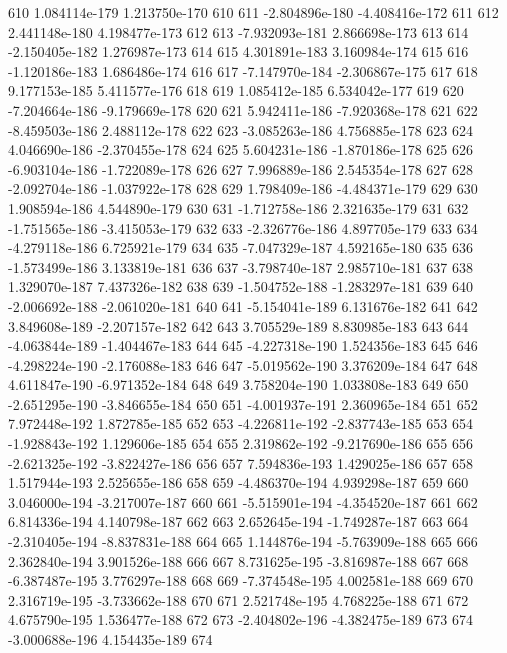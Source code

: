 \documentclass{article}
\begin{document}
\begin{Schunk}
\begin{Soutput}
610   1.084114e-179  1.213750e-170  610
611  -2.804896e-180 -4.408416e-172  611
612   2.441148e-180  4.198477e-173  612
613  -7.932093e-181  2.866698e-173  613
614  -2.150405e-182  1.276987e-173  614
615   4.301891e-183  3.160984e-174  615
616  -1.120186e-183  1.686486e-174  616
617  -7.147970e-184 -2.306867e-175  617
618   9.177153e-185  5.411577e-176  618
619   1.085412e-185  6.534042e-177  619
620  -7.204664e-186 -9.179669e-178  620
621   5.942411e-186 -7.920368e-178  621
622  -8.459503e-186  2.488112e-178  622
623  -3.085263e-186  4.756885e-178  623
624   4.046690e-186 -2.370455e-178  624
625   5.604231e-186 -1.870186e-178  625
626  -6.903104e-186 -1.722089e-178  626
627   7.996889e-186  2.545354e-178  627
628  -2.092704e-186 -1.037922e-178  628
629   1.798409e-186 -4.484371e-179  629
630   1.908594e-186  4.544890e-179  630
631  -1.712758e-186  2.321635e-179  631
632  -1.751565e-186 -3.415053e-179  632
633  -2.326776e-186  4.897705e-179  633
634  -4.279118e-186  6.725921e-179  634
635  -7.047329e-187  4.592165e-180  635
636  -1.573499e-186  3.133819e-181  636
637  -3.798740e-187  2.985710e-181  637
638   1.329070e-187  7.437326e-182  638
639  -1.504752e-188 -1.283297e-181  639
640  -2.006692e-188 -2.061020e-181  640
641  -5.154041e-189  6.131676e-182  641
642   3.849608e-189 -2.207157e-182  642
643   3.705529e-189  8.830985e-183  643
644  -4.063844e-189 -1.404467e-183  644
645  -4.227318e-190  1.524356e-183  645
646  -4.298224e-190 -2.176088e-183  646
647  -5.019562e-190  3.376209e-184  647
648   4.611847e-190 -6.971352e-184  648
649   3.758204e-190  1.033808e-183  649
650  -2.651295e-190 -3.846655e-184  650
651  -4.001937e-191  2.360965e-184  651
652   7.972448e-192  1.872785e-185  652
653  -4.226811e-192 -2.837743e-185  653
654  -1.928843e-192  1.129606e-185  654
655   2.319862e-192 -9.217690e-186  655
656  -2.621325e-192 -3.822427e-186  656
657   7.594836e-193  1.429025e-186  657
658   1.517944e-193  2.525655e-186  658
659  -4.486370e-194  4.939298e-187  659
660   3.046000e-194 -3.217007e-187  660
661  -5.515901e-194 -4.354520e-187  661
662   6.814336e-194  4.140798e-187  662
663   2.652645e-194 -1.749287e-187  663
664  -2.310405e-194 -8.837831e-188  664
665   1.144876e-194 -5.763909e-188  665
666   2.362840e-194  3.901526e-188  666
667   8.731625e-195 -3.816987e-188  667
668  -6.387487e-195  3.776297e-188  668
669  -7.374548e-195  4.002581e-188  669
670   2.316719e-195 -3.733662e-188  670
671   2.521748e-195  4.768225e-188  671
672   4.675790e-195  1.536477e-188  672
673  -2.404802e-196 -4.382475e-189  673
674  -3.000688e-196  4.154435e-189  674

\end{Soutput}
\end{Schunk}
\end{document}
